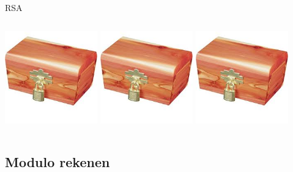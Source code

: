 \documentclass{beamer}
\begin{document}
\begin{frame}{RSA}
\begin{columns}
\begin{column}[T]{0.5\textwidth}
			\includegraphics[width=0.3\textwidth]{img/padlock.jpeg}
			\includegraphics[width=0.3\textwidth]{img/padlock.jpeg}
			\includegraphics[width=0.3\textwidth]{img/padlock.jpeg}
		\end{column}
	\end{columns}
\end{frame}

\subsection{Modulo rekenen}
\end{document}

